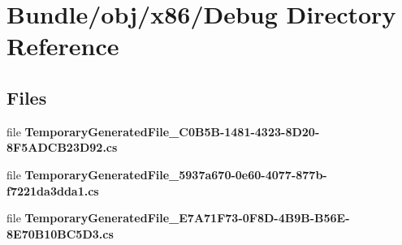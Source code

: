 \section{Bundle/obj/x86/\+Debug Directory Reference}
\label{dir_0699898ec98f09a26b0de7d3d5aad840}
\subsection*{Files}
\begin{DoxyCompactItemize}
\item 
file {\bfseries Temporary\+Generated\+File\+\_\+C0\+B5\+B-\/1481-\/4323-\/8\+D20-\/8\+F5\+A\+D\+C\+B23\+D92.\+cs}
\item 
file {\bfseries Temporary\+Generated\+File\+\_\+5937a670-\/0e60-\/4077-\/877b-\/f7221da3dda1.\+cs}
\item 
file {\bfseries Temporary\+Generated\+File\+\_\+\+E7\+A71\+F73-\/0\+F8\+D-\/4\+B9\+B-\/\+B56\+E-\/8\+E70\+B10\+B\+C5\+D3.\+cs}
\end{DoxyCompactItemize}
